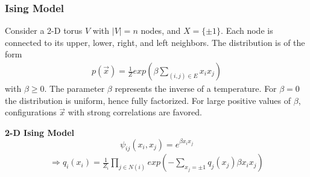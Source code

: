 \documentclass[11pt,a4paper]{article}
\begin{document}
\subsubsection{Ising Model}
Consider a 2-D torus $V$ with $|V| = n$ nodes, and $X = \{\pm 1\}$. Each node is connected to its upper, lower, right, and left neighbors. The distribution is of the form
\begin{equation}
    \begin{aligned}
        p(\vec{x})=\frac{1}{Z}exp\left(\beta\sum_{(i,j)\in E}x_ix_j\right)
    \end{aligned}
    \nonumber
\end{equation}
with $\beta \geq 0$. The parameter $\beta$ represents the inverse of a temperature. For $\beta = 0$ the distribution is uniform, hence fully factorized. For large positive values of $\beta$, configurations $\vec{x}$ with strong correlations are favored.

\textbf{2-D Ising Model}
$$\psi_{ij}(x_i,x_j)=e^{\beta x_ix_j}$$
\begin{equation}
    \begin{aligned}
        \Rightarrow q_i(x_i)=\frac{1}{Z_i}\prod_{j\in N(i)}exp\left(-\sum_{x_j=\pm 1}q_j(x_j)\beta x_i x_j\right)
    \end{aligned}
    \nonumber
\end{equation}
\end{document}
